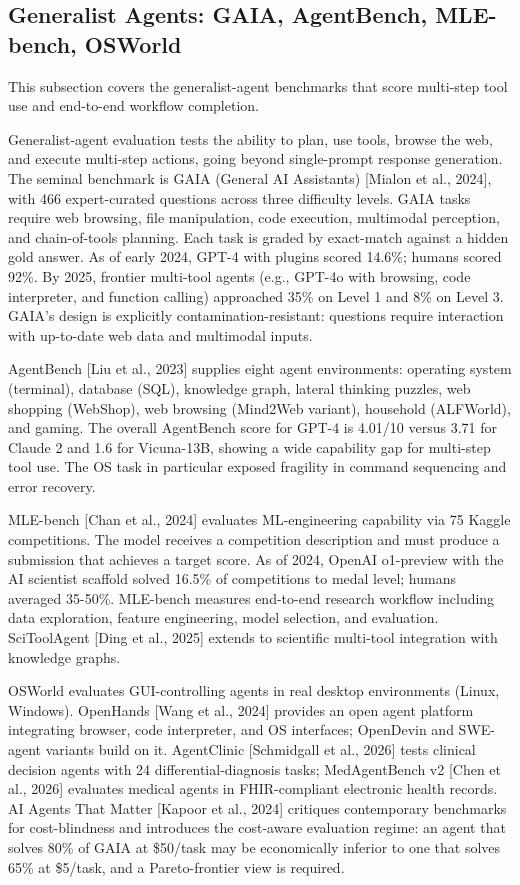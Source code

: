 \subsection{Generalist Agents: GAIA, AgentBench, MLE-bench, OSWorld}\label{generalist-agents-gaia-agentbench-mle-bench-osworld}

This subsection covers the generalist-agent benchmarks that score multi-step tool use and end-to-end workflow completion.

Generalist-agent evaluation tests the ability to plan, use tools, browse the web, and execute multi-step actions, going beyond single-prompt response generation. The seminal benchmark is GAIA (General AI Assistants) {[}Mialon et al., 2024{]}, with 466 expert-curated questions across three difficulty levels. GAIA tasks require web browsing, file manipulation, code execution, multimodal perception, and chain-of-tools planning. Each task is graded by exact-match against a hidden gold answer. As of early 2024, GPT-4 with plugins scored 14.6\%; humans scored 92\%. By 2025, frontier multi-tool agents (e.g., GPT-4o with browsing, code interpreter, and function calling) approached 35\% on Level 1 and 8\% on Level 3. GAIA's design is explicitly contamination-resistant: questions require interaction with up-to-date web data and multimodal inputs.

AgentBench {[}Liu et al., 2023{]} supplies eight agent environments: operating system (terminal), database (SQL), knowledge graph, lateral thinking puzzles, web shopping (WebShop), web browsing (Mind2Web variant), household (ALFWorld), and gaming. The overall AgentBench score for GPT-4 is 4.01/10 versus 3.71 for Claude 2 and 1.6 for Vicuna-13B, showing a wide capability gap for multi-step tool use. The OS task in particular exposed fragility in command sequencing and error recovery.

MLE-bench {[}Chan et al., 2024{]} evaluates ML-engineering capability via 75 Kaggle competitions. The model receives a competition description and must produce a submission that achieves a target score. As of 2024, OpenAI o1-preview with the AI scientist scaffold solved 16.5\% of competitions to medal level; humans averaged 35-50\%. MLE-bench measures end-to-end research workflow including data exploration, feature engineering, model selection, and evaluation. SciToolAgent {[}Ding et al., 2025{]} extends to scientific multi-tool integration with knowledge graphs.

OSWorld evaluates GUI-controlling agents in real desktop environments (Linux, Windows). OpenHands {[}Wang et al., 2024{]} provides an open agent platform integrating browser, code interpreter, and OS interfaces; OpenDevin and SWE-agent variants build on it. AgentClinic {[}Schmidgall et al., 2026{]} tests clinical decision agents with 24 differential-diagnosis tasks; MedAgentBench v2 {[}Chen et al., 2026{]} evaluates medical agents in FHIR-compliant electronic health records. AI Agents That Matter {[}Kapoor et al., 2024{]} critiques contemporary benchmarks for cost-blindness and introduces the cost-aware evaluation regime: an agent that solves 80\% of GAIA at \$50/task may be economically inferior to one that solves 65\% at \$5/task, and a Pareto-frontier view is required.

